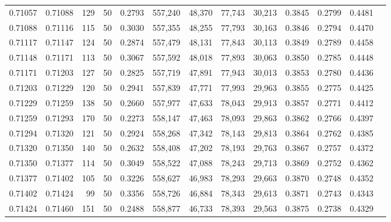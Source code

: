 \begin{tabular}{rrrrrrrrrrrrr}
0.71057 & 0.71088 &   129 &  50 &                                     0.2793 & 557,240 &  48,370 &  77,743 &  30,213 & 0.3845 & 0.2799 & 0.4481 \\
0.71088 & 0.71116 &   115 &  50 &                                     0.3030 & 557,355 &  48,255 &  77,793 &  30,163 & 0.3846 & 0.2794 & 0.4470 \\
0.71117 & 0.71147 &   124 &  50 &                                     0.2874 & 557,479 &  48,131 &  77,843 &  30,113 & 0.3849 & 0.2789 & 0.4458 \\
0.71148 & 0.71171 &   113 &  50 &                                     0.3067 & 557,592 &  48,018 &  77,893 &  30,063 & 0.3850 & 0.2785 & 0.4448 \\
0.71171 & 0.71203 &   127 &  50 &                                     0.2825 & 557,719 &  47,891 &  77,943 &  30,013 & 0.3853 & 0.2780 & 0.4436 \\
0.71203 & 0.71229 &   120 &  50 &                                     0.2941 & 557,839 &  47,771 &  77,993 &  29,963 & 0.3855 & 0.2775 & 0.4425 \\
0.71229 & 0.71259 &   138 &  50 &                                     0.2660 & 557,977 &  47,633 &  78,043 &  29,913 & 0.3857 & 0.2771 & 0.4412 \\
0.71259 & 0.71293 &   170 &  50 &                                     0.2273 & 558,147 &  47,463 &  78,093 &  29,863 & 0.3862 & 0.2766 & 0.4397 \\
0.71294 & 0.71320 &   121 &  50 &                                     0.2924 & 558,268 &  47,342 &  78,143 &  29,813 & 0.3864 & 0.2762 & 0.4385 \\
0.71320 & 0.71350 &   140 &  50 &                                     0.2632 & 558,408 &  47,202 &  78,193 &  29,763 & 0.3867 & 0.2757 & 0.4372 \\
0.71350 & 0.71377 &   114 &  50 &                                     0.3049 & 558,522 &  47,088 &  78,243 &  29,713 & 0.3869 & 0.2752 & 0.4362 \\
0.71377 & 0.71402 &   105 &  50 &                                     0.3226 & 558,627 &  46,983 &  78,293 &  29,663 & 0.3870 & 0.2748 & 0.4352 \\
0.71402 & 0.71424 &    99 &  50 &                                     0.3356 & 558,726 &  46,884 &  78,343 &  29,613 & 0.3871 & 0.2743 & 0.4343 \\
0.71424 & 0.71460 &   151 &  50 &                                     0.2488 & 558,877 &  46,733 &  78,393 &  29,563 & 0.3875 & 0.2738 & 0.4329 \\

\end{tabular}
